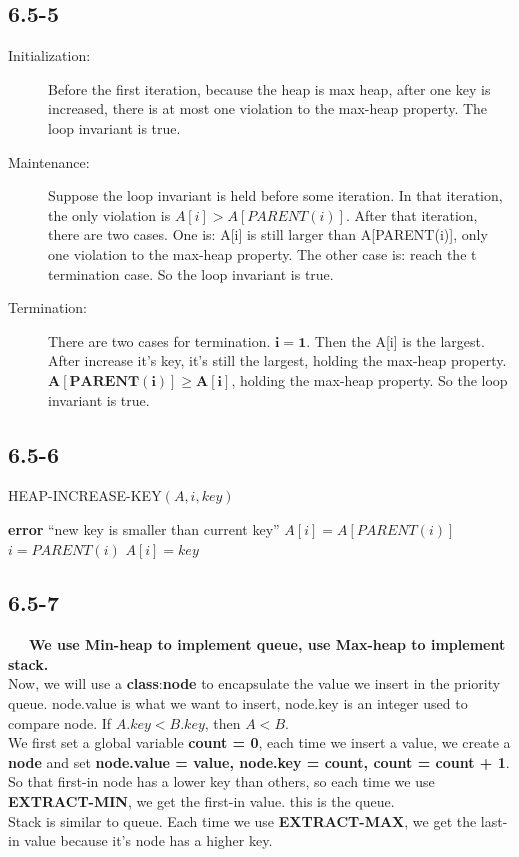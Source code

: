 \documentclass{article}
\newcommand*\circled[1]{\tikz[baseline=(char.base)]{
    \node[shape=circle, draw, inner sep=2pt] (char) {#1};}}
\begin{document}
\subsection*{6.5-5}
\begin{description}
\item[Initialization: ]Before the first iteration, because the heap is max heap, after one key is increased, there is at most one violation to the max-heap property. The loop invariant is true.
\item[Maintenance: ] Suppose the loop invariant is held before some iteration. In that iteration, the only violation is $A[i] > A[PARENT(i)]$. After that iteration, there are two cases. One is: A[i] is still larger than A[PARENT(i)], only one violation to the max-heap property. The other case is: reach the t termination case. So the loop invariant is true.
\item[Termination: ]There are two cases for termination. \circled{1}$\mathbf{i = 1}$. Then the A[i] is the largest. After increase it's key, it's still the largest, holding the max-heap property. \circled{2}$\mathbf{A[PARENT(i)] \ge A[i]}$, holding the max-heap property. So the loop invariant is true.
\end{description}
\newpage
\subsection*{6.5-6}
\begin{algorithm}
\caption{HEAP-INCREASE-KEY$(A, i, key)$}
\begin{algorithmic}[1]
\STATE \textbf{error} ``new key is smaller than current key''
\ENDIF
{}
\STATE $A[i] = A[PARENT(i)]$
\STATE $i = PARENT(i)$
\ENDWHILE
\STATE $A[i] = key$
\end{algorithmic}
\end{algorithm}


\subsection*{6.5-7}
~~~\textbf{We use Min-heap to implement queue, use Max-heap to implement stack.}\\
\indent Now, we will use a \textbf{class}:\textbf{node} to encapsulate the value we insert in the priority queue. node.value is what we want to insert, node.key is an integer used to compare node. If $A.key < B.key$, then $A < B$.\\
\indent We first set a global variable \textbf{count = 0}, each time we insert a value, we create a \textbf{node} and set \textbf{node.value = value, node.key = count, count = count + 1}. So that first-in node has a lower key than others, so each time we use \textbf{EXTRACT-MIN}, we get the first-in value. this is the queue.\\
\indent Stack is similar to queue. Each time we use \textbf{EXTRACT-MAX}, we get the last-in value because it's node has a higher key.
\end{document}
